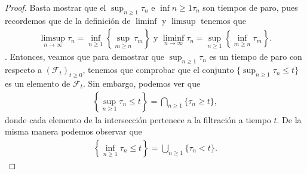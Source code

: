 \begin{proof}
	Basta mostrar que el $\sup_{n \geq 1} \tau_n$ e $\inf{n \geq 1} \tau_n$ son tiempos de paro, pues recordemos que de la definición de $\liminf$ y $\limsup$ tenemos que 
	\begin{align*}
		\limsup_{n \rightarrow \infty} \tau_n = \inf_{n \geq 1} \left\{ \sup_{m \geq n} \tau_m \right\} \text{   y   } \liminf_{n \rightarrow \infty}\tau_n = \sup_{n \geq 1} \left\{ \inf_{m \geq n} \tau_m \right\}.
	\end{align*}.
	Entonces, veamos que para demostrar que $\sup_{n \geq 1} \tau_n$ es un tiempo de paro con respecto a $(\mathcal{F}_t)_{t \geq 0}$, tenemos que comprobar que el conjunto $\{ \sup_{n \geq 1} \tau_n \leq t\}$ es un elemento de $\mathcal{F}_t$. Sin embargo, podemos ver que
	\begin{align*}
		\left\{ \sup_{n \geq 1} \tau_n \leq t \right\} = \bigcap_{n \geq 1} \{\tau_n \geq t\},
	\end{align*}
	donde cada elemento de la intersección pertenece a la filtración a tiempo $t$. De la misma manera podemos observar que
	\begin{align*}
		\left\{ \inf_{n \geq 1} \tau_n \leq t \right\} = \bigcup_{n \geq 1} \{\tau_n < t\}.
	\end{align*}
\end{proof}

